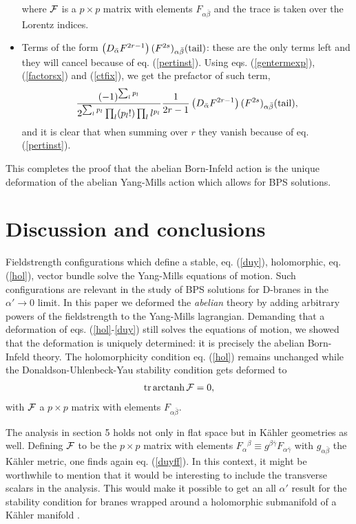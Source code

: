 \documentclass[a4paper,12pt,oneside]{article}
\newcommand{\tail}{\mbox{$({\rm tail})$}}
\begin{document}
\begin{itemize}
where ${\cal F}$ is a $p\times p$ matrix with elements $F_{\alpha 
\bar\beta}$ and the trace is taken over the Lorentz indices.
\item Terms of the form $\left( D_{\bar{\alpha}} F^{2r-1} \right) 
(F^{2s})_{\alpha\bar{\beta}} \tail$: 
these are the only terms left and they will cancel because of eq. 
(\ref{pertinst}). Using
eqs. (\ref{gentermexp}), (\ref{factorsx}) and (\ref{ctfix}), 
we get the prefactor of such term, 
\begin{eqnarray}
\frac{(-1)^{\sum_l p_l}}{2^{\sum_l p_l}
\prod_l (p_l!)\prod_l l^{p_l}}\frac{1}{2r-1}
\left( D_{\bar{\alpha}} F^{2r-1} \right) (F^{2s})_{\alpha\bar{\beta}} \tail,
\end{eqnarray}
and it is clear that when summing over $r$ they vanish because of eq. 
(\ref{pertinst}).
\end{itemize}
This completes the proof that the abelian Born-Infeld action is the
unique deformation of the abelian Yang-Mills action which allows for
BPS solutions.


\setcounter{equation}{0}
\section{Discussion and conclusions}
Fieldstrength configurations which define a stable, eq. (\ref{duy}),
holomorphic, eq. (\ref{hol}), vector bundle solve the Yang-Mills
equations of motion. Such configurations are relevant in the study of BPS
solutions for D-branes in the $\alpha '\rightarrow 0$ limit. In this
paper we deformed the {\it abelian} theory by adding arbitrary powers of
the fieldstrength to the Yang-Mills lagrangian. Demanding that a
deformation of eqs. (\ref{hol}-\ref{duy}) still solves the equations of
motion, we showed that the deformation is uniquely determined: it is
precisely the abelian Born-Infeld theory. The holomorphicity condition
eq. (\ref{hol}) remains unchanged while the Donaldson-Uhlenbeck-Yau
stability condition gets deformed to 
\begin{eqnarray} \mbox{tr}\, {\rm arctanh} \, {\cal F}=0,\label{duyff} 
\end{eqnarray} 
with ${\cal F}$ a $p\times p$ matrix with elements $F_{\alpha
\bar\beta}$. 

The analysis in section 5 holds not only in flat space but in K\"ahler
geometries as well. Defining ${\cal F}$ to be the $p\times p$ matrix with
elements $F_\alpha {}^\beta \equiv g^{\beta\bar\gamma}F_{\alpha\bar\gamma
}$ with $g_{\alpha \bar\beta}$ the K\"ahler metric, one finds again eq.
(\ref{duyff}). In this context, it might be worthwhile to mention that it
would be interesting to include the transverse scalars in the analysis.
This would make it possible to get an all $\alpha '$ result for the
stability condition for branes wrapped around a holomorphic submanifold
of a K\"ahler manifold \cite{HM}.
\end{document}

